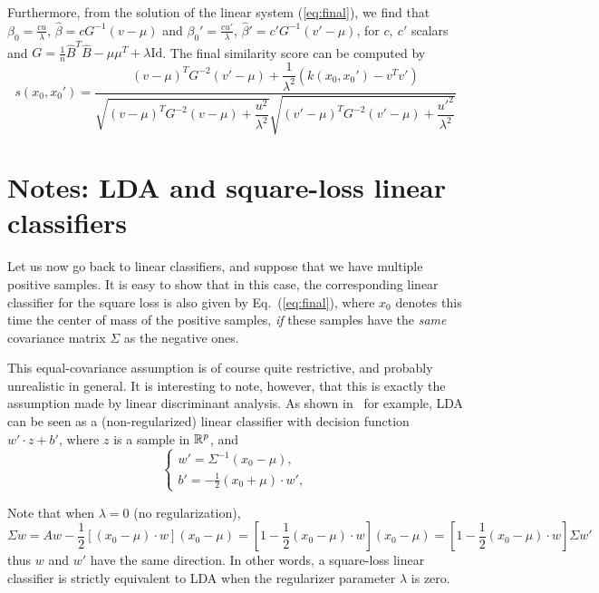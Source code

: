 \documentclass[12pt,letterpaper]{article}
\begin{document}
Furthermore, from the solution of the linear system (\ref{eq:final}), we find that $\beta_0 = \frac{cu}{\lambda}$, $\hat{\beta} = cG^{-1}(v-\mu)$ and $\beta_0' = \frac{cu'}{\lambda}$, $\hat{\beta}' = c'G^{-1}(v'-\mu)$, for $c,\ c'$ scalars and $G = \frac{1}{n}\hat{B}^T\hat{B}-\mu\mu^T+\lambda\text{Id}$. The final similarity score can be computed by
\begin{equation}
s(x_0,x_0') = \dfrac{(v-\mu)^TG^{-2}(v'-\mu)+\dfrac{1}{\lambda^2}(k(x_0,x_0')-v^Tv')}{\sqrt{(v-\mu)^TG^{-2}(v-\mu)+\dfrac{u^2}{\lambda^2}}\sqrt{(v'-\mu)^TG^{-2}(v'-\mu)+\dfrac{u'^2}{\lambda^2}}}
\end{equation}
 
\section{Notes: LDA and square-loss linear classifiers}
Let us now go back to linear classifiers, and suppose that we have
multiple positive samples. It is easy to show that in this case, the
corresponding linear classifier for the square loss is also given by
Eq.~(\ref{eq:final}), where $x_0$ denotes this time the center of mass
of the positive samples, {\em if} these samples have the {\em same}
covariance matrix $\Sigma$ as the negative ones.
 
This equal-covariance assumption is of course quite restrictive, and
probably unrealistic in general. It is interesting to note, however,
that this is exactly the assumption made by linear discriminant
analysis. As shown in~\cite{Hastie2009} for example, LDA can be seen as a
(non-regularized) linear classifier
with decision function $w'\cdot z+ b'$, where $z$ is a sample in
$\mathbb{R}^p$, and
\begin{equation}
\left\{\begin{array}{l}
\displaystyle w'=\Sigma^{-1}(x_0-\mu),\\
\displaystyle b'=-\frac{1}{2}(x_0+\mu)\cdot w',
\end{array}\right.
\label{eq:lda}
\end{equation}
 
Note that when $\lambda=0$ (no regularization),
\begin{equation}
\Sigma w = Aw -\frac{1}{2}[(x_0-\mu)\cdot w] (x_0-\mu) =
[1-\frac{1}{2}(x_0-\mu)\cdot w](x_0-\mu)
=[1-\frac{1}{2}(x_0-\mu)\cdot w]\Sigma w'
\end{equation}
thus $w$ and $w'$ have the same direction. In other words, a
square-loss linear classifier is strictly equivalent to LDA when the
regularizer parameter $\lambda $ is zero.
 
\end{document}
